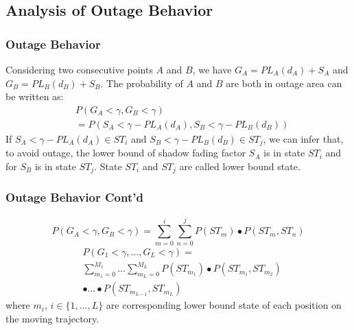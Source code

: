 \documentclass{beamer}
\begin{document}
\subsection{Analysis of Outage Behavior}
%
\begin{frame}
\frametitle{Outage Behavior}
Considering two consecutive points $A$ and $B$, we have $G_{A}=PL_{A}(d_{A})+S_{A}$ and $G_{B}=PL_{B}(d_{B})+S_{B}$. The probability of $A$ and $B$ are both in outage area can be written as:
\begin{equation}
\begin{split}
&P(G_{A}<\gamma, G_{B}<\gamma) \\
&= P(S_{A}<\gamma-PL_{A}(d_{A}), S_{B}<\gamma-PL_{B}(d_{B}))
\end{split}
\end{equation}
If $S_{A}<\gamma-PL_{A}(d_{A}) \in ST_{i}$ and $S_{B}<\gamma-PL_{B}(d_{B}) \in ST_{j}$, we can infer that, to avoid outage, the lower bound of shadow fading factor $S_{A}$ is in state $ST_{i}$ and for $S_{B}$ is in state $ST_{j}$. State $ST_{i}$ and $ST_{j}$ are called lower bound state. 
\end{frame}
%
\begin{frame}
\frametitle{Outage Behavior Cont'd}
\begin{equation}
P(G_{A}<\gamma, G_{B}<\gamma)=\sum_{m=0}^{i}\sum_{n=0}^{j} P(ST_{m})\bullet P(ST_{m},ST_{n})
\end{equation}
\begin{equation}
\begin{split}
&P(G_{1}<\gamma,\dots,G_{L}<\gamma)=\\
&\sum_{m_{1}=0}^{M_{1}}\dots\sum_{m_{L}=0}^{M_{L}} P(ST_{m_{1}})\bullet P(ST_{m_{1}},ST_{m_{2}})\\
&\bullet\dots\bullet P(ST_{m_{L-1}},ST_{m_{L}})
\end{split}
\end{equation}
where $m_{i}$, $i\in\{1,\dots,L\}$ are corresponding lower bound state of each position on the moving trajectory.
\end{frame}
\end{document}
